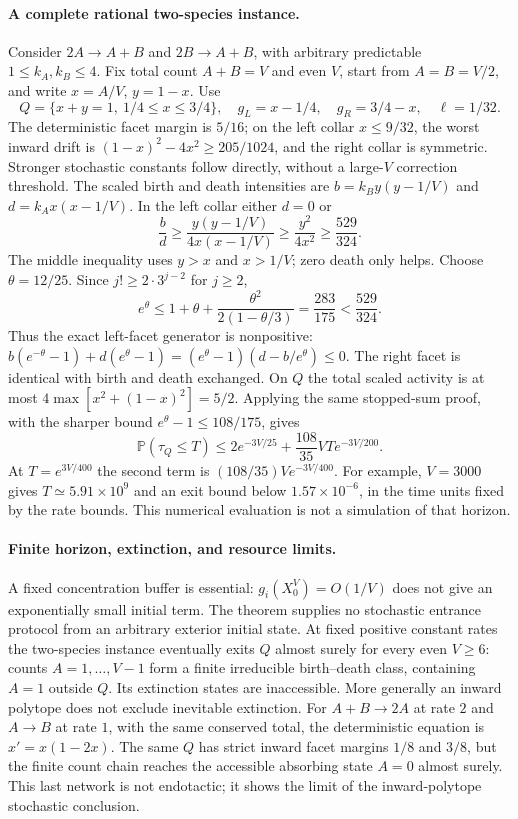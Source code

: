 \documentclass[11pt]{article}
\theoremstyle{definition}
\theoremstyle{remark}
\numberwithin{equation}{section}
\begin{document}
\paragraph{A complete rational two-species instance.}
Consider $2A\to A+B$ and $2B\to A+B$, with arbitrary predictable
$1\le k_A,k_B\le4$. Fix total count $A+B=V$ and even $V$, start from
$A=B=V/2$, and write $x=A/V$, $y=1-x$. Use
\[
 Q=\{x+y=1,\ 1/4\le x\le3/4\},\quad
 g_L=x-1/4,\quad g_R=3/4-x,\quad\ell=1/32.
\]
The deterministic facet margin is $5/16$; on the left collar
$x\le9/32$, the worst inward drift is
$(1-x)^2-4x^2\ge205/1024$, and the right collar is symmetric.
Stronger stochastic constants follow directly, without a large-$V$
correction threshold. The scaled birth and death intensities are
$b=k_B y(y-1/V)$ and $d=k_A x(x-1/V)$.
In the left collar either $d=0$ or
\[
 \frac bd\ge\frac{y(y-1/V)}{4x(x-1/V)}
        \ge\frac{y^2}{4x^2}\ge\frac{529}{324}.
\]
The middle inequality uses $y>x$ and $x>1/V$; zero death only helps.
Choose $\theta=12/25$. Since $j!\ge2\cdot3^{j-2}$ for $j\ge2$,
\[
 e^\theta\le1+\theta+
       \frac{\theta^2}{2(1-\theta/3)}
       =\frac{283}{175}<\frac{529}{324}.
\]
Thus the exact left-facet generator is nonpositive:
$b(e^{-\theta}-1)+d(e^\theta-1)
 =(e^\theta-1)(d-b/e^\theta)\le0$.
The right facet is identical with birth and death exchanged.
On $Q$ the total scaled activity is at most
$4\max[x^2+(1-x)^2]=5/2$. Applying the same stopped-sum proof, with
the sharper bound $e^\theta-1\le108/175$, gives
\begin{equation}
 \mathbb P(\tau_Q\le T)
    \le 2e^{-3V/25}+\frac{108}{35}VT e^{-3V/200}.
 \label{eq:jump-two-species}
\end{equation}
At $T=e^{3V/400}$ the second term is
$(108/35)V e^{-3V/400}$. For example, $V=3000$ gives
$T\simeq5.91\times10^9$ and an exit bound below $1.57\times10^{-6}$,
in the time units fixed by the rate bounds. This numerical evaluation
is not a simulation of that horizon.

\paragraph{Finite horizon, extinction, and resource limits.}
A fixed concentration buffer is essential: $g_i(X^V_0)=O(1/V)$ does
not give an exponentially small initial term. The theorem supplies no
stochastic entrance protocol from an arbitrary exterior initial state.
At fixed positive constant rates the two-species instance eventually
exits $Q$ almost surely for every even $V\ge6$: counts
$A=1,\ldots,V-1$ form a finite irreducible birth--death class, containing
$A=1$ outside $Q$. Its extinction states are inaccessible.
More generally an inward polytope does not exclude inevitable
extinction. For $A+B\to2A$ at rate $2$ and $A\to B$ at rate $1$,
with the same conserved total, the deterministic equation is
$x'=x(1-2x)$. The same $Q$ has strict inward facet margins $1/8$ and
$3/8$, but the finite count chain reaches the accessible absorbing
state $A=0$ almost surely. This last network is not endotactic; it
shows the limit of the inward-polytope stochastic conclusion.
\end{document}
